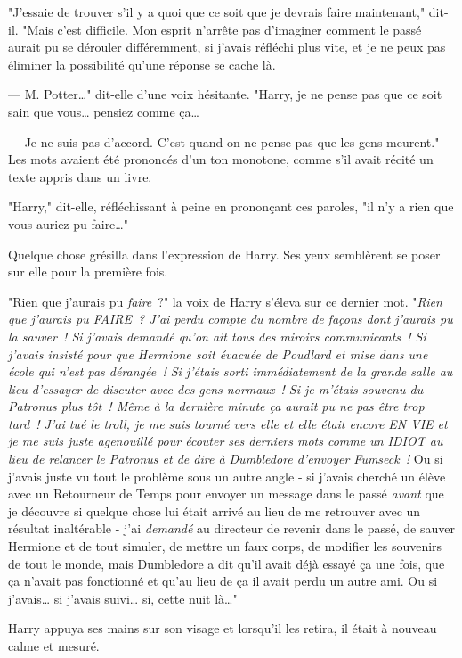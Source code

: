 "J'essaie de trouver s'il y a quoi que ce soit que je devrais faire maintenant," dit-il. "Mais c'est difficile. Mon esprit n'arrête pas d'imaginer comment le passé aurait pu se dérouler différemment, si j'avais réfléchi plus vite, et je ne peux pas éliminer la possibilité qu'une réponse se cache là.

--- M. Potter…" dit-elle d'une voix hésitante. "Harry, je ne pense pas que ce soit sain que vous… pensiez comme ça…

--- Je ne suis pas d'accord. C'est quand on ne pense pas que les gens meurent." Les mots avaient été prononcés d'un ton monotone, comme s'il avait récité un texte appris dans un livre.

"Harry," dit-elle, réfléchissant à peine en prononçant ces paroles, "il n'y a rien que vous auriez pu faire…"

Quelque chose grésilla dans l'expression de Harry. Ses yeux semblèrent se poser sur elle pour la première fois.

"Rien que j'aurais pu \emph{faire}~?" la voix de Harry s'éleva sur ce dernier mot. "\emph{Rien que j'aurais pu FAIRE~? J'ai perdu compte du nombre de façons dont j'aurais pu la sauver~! Si j'avais demandé qu'on ait tous des miroirs communicants~! Si j'avais insisté pour que Hermione soit évacuée de Poudlard et mise dans une école qui n'est pas dérangée~! Si j'étais sorti immédiatement de la grande salle au lieu d'essayer de discuter avec des gens normaux~! Si je m'étais souvenu du Patronus plus tôt~! Même à la dernière minute ça aurait pu ne pas être trop tard~! J'ai tué le troll, je me suis tourné vers elle et elle était encore EN VIE et je me suis juste agenouillé pour écouter ses derniers mots comme un IDIOT au lieu de relancer le Patronus et de dire à Dumbledore d'envoyer Fumseck~!} Ou si j'avais juste vu tout le problème sous un autre angle - si j'avais cherché un élève avec un Retourneur de Temps pour envoyer un message dans le passé \emph{avant} que je découvre si quelque chose lui était arrivé au lieu de me retrouver avec un résultat inaltérable - j'ai \emph{demandé} au directeur de revenir dans le passé, de sauver Hermione et de tout simuler, de mettre un faux corps, de modifier les souvenirs de tout le monde, mais Dumbledore a dit qu'il avait déjà essayé ça une fois, que ça n'avait pas fonctionné et qu'au lieu de ça il avait perdu un autre ami. Ou si j'avais… si j'avais suivi… si, cette nuit là…"

Harry appuya ses mains sur son visage et lorsqu'il les retira, il était à nouveau calme et mesuré.

